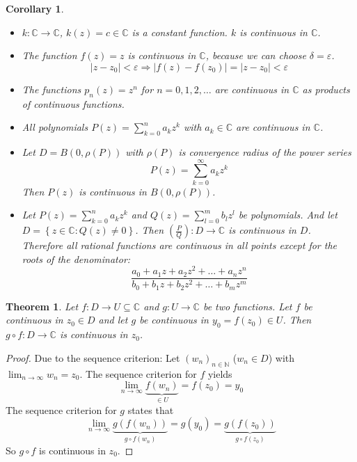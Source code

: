 \documentclass[a4paper,landscape,twocolumn]{article}
\newtheorem{theorem}{Theorem}
\newtheorem{cor}{Corollary}
\newcommand\set[1]{\left\{#1\right\}}
\newcommand\abs[1]{\left|#1\right|}
\newcommand\seq[1]{{\left(#1\right)}_{n \in \mathbb N}}
\begin{document}
\begin{cor}
  \hfill{}
  \begin{itemize}
    \item $k: \mathbb C \to \mathbb C$, $k(z) = c \in \mathbb C$ is a constant function.
      $k$ is continuous in $\mathbb C$.
    \item The function $f(z) = z$ is continuous in $\mathbb C$, because we can choose $\delta = \varepsilon$.
      \[ \abs{z - z_0} < \varepsilon \Rightarrow \abs{f(z) - f(z_0)} = \abs{z - z_0} < \varepsilon \]
    \item The functions $p_n(z) = z^n$ for $n = 0,1,2,\ldots$ are continuous in $\mathbb C$ as products of continuous functions.
    \item All polynomials $P(z) = \sum_{k=0}^n a_k z^k$ with $a_k \in \mathbb C$ are continuous in $\mathbb C$.
    \item Let $D = B(0, \rho(P))$ with $\rho(P)$ is convergence radius of the power series
      \[ P(z) = \sum_{k=0}^\infty a_k z^k \]
      Then $P(z)$ is continuous in $B(0, \rho(P))$.
    \item Let $P(z) = \sum_{k=0}^n a_k z^k$ and $Q(z) = \sum_{l=0}^m b_l z^l$ be polynomials.
      And let $D = \set{z \in \mathbb C: Q(z) \neq 0}$. Then $\left(\frac PQ\right): D \to \mathbb C$
      is continuous in $D$. \\
      Therefore all rational functions are continuous in all points except for the roots of the denominator:
      \[ \frac{a_0 + a_1 z + a_2 z^2 + \ldots + a_n z^n}{b_0 + b_1 z + b_2 z^2 + \ldots + b_m z^m} \]
  \end{itemize}
\end{cor}

\begin{theorem}
  Let $f: D \to U \subseteq \mathbb C$ and $g: U \to \mathbb C$ be two functions.
  Let $f$ be continuous in $z_0 \in D$ and let $g$ be continuous in $y_0 = f(z_0) \in U$.
  Then $g \circ f: D \to \mathbb C$ is continuous in $z_0$.
\end{theorem}
\begin{proof}
  Due to the sequence criterion: Let $\seq{w_n}$ ($w_n \in D$) with $\lim_{n\to\infty} w_n = z_0$.
  The sequence criterion for $f$ yields
  \[ \lim_{n\to\infty} \underbrace{f(w_n)}_{\in U} = f(z_0) = y_0 \]
  The sequence criterion for $g$ states that
  \[ \lim_{n\to\infty} \underbrace{g(f(w_n))}_{g \circ f(w_n)} = g(y_0) = \underbrace{g(f(z_0))}_{g \circ f(z_0)} \]
  So $g \circ f$ is continuous in $z_0$.
\end{proof}
\end{document}
